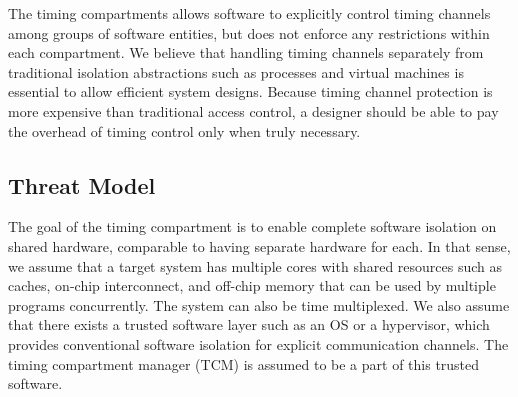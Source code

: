 
The timing compartments allows software to explicitly control timing channels
among groups of software entities, but does not enforce any restrictions within
each compartment. We believe that handling timing channels separately from
traditional isolation abstractions such as processes and virtual machines is essential
to allow efficient system designs. Because timing channel protection is more expensive
than traditional access control, a designer should be able to pay the overhead
of timing control only when truly necessary.


\subsection{Threat Model}

The goal of the timing compartment is to enable complete software isolation
on shared hardware, comparable to having separate hardware for each.
In that sense, we assume that a target system has multiple cores with shared
resources such as caches, on-chip interconnect, and off-chip memory that can
be used by multiple programs concurrently. The system can also be time multiplexed.
We also assume that there exists a trusted software layer such as an OS or a hypervisor,
which provides conventional software isolation for explicit communication channels.
The timing compartment manager (TCM) is assumed to be a part of this trusted software.

